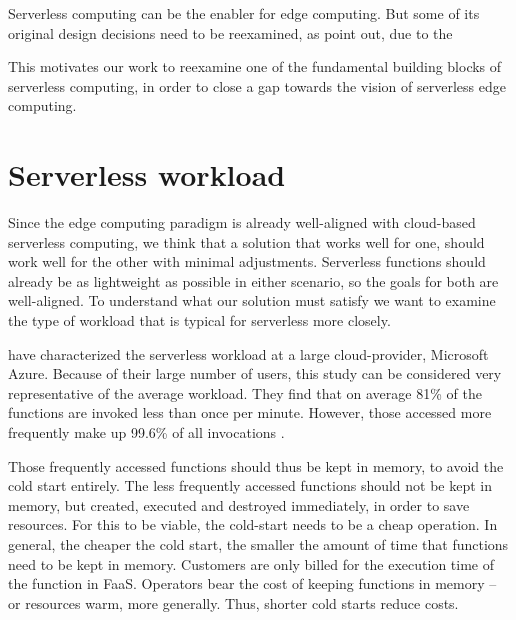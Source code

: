 Serverless computing can be the enabler for edge computing. But some of its original design decisions need to be reexamined, as \citeauthor{Nastic2018} point out, due to the

\begin{quote}
\end{quote}

This motivates our work to reexamine one of the fundamental building blocks of serverless computing, in order to close a gap towards the vision of serverless edge computing.

\section{Serverless workload}

Since the edge computing paradigm is already well-aligned with cloud-based serverless computing, we think that a solution that works well for one, should work well for the other with minimal adjustments. Serverless functions should already be as lightweight as possible in either scenario, so the goals for both are well-aligned.
To understand what our solution must satisfy we want to examine the type of workload that is typical for serverless more closely.

\citeauthor{Shahrad2020} have characterized the serverless workload at a large cloud-provider, Microsoft Azure. Because of their large number of users, this study can be considered very representative of the average workload.
They find that on average 81\% of the functions are invoked less than once per minute. However, those accessed more frequently make up 99.6\% of all invocations \cite{Shahrad2020}.

Those frequently accessed functions should thus be kept in memory, to avoid the cold start entirely. The less frequently accessed functions should not be kept in memory, but created, executed and destroyed immediately, in order to save resources. For this to be viable, the cold-start needs to be a cheap operation. In general, the cheaper the cold start, the smaller the amount of time that functions need to be kept in memory.
Customers are only billed for the execution time of the function in FaaS. Operators bear the cost of keeping functions in memory -- or resources warm, more generally. Thus, shorter cold starts reduce costs.

